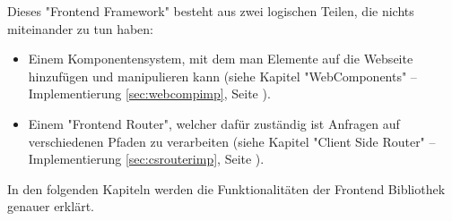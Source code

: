 Dieses "Frontend Framework" besteht aus zwei logischen Teilen, die nichts miteinander zu tun haben:
\begin{itemize}
    \item Einem Komponentensystem, mit dem man Elemente auf die Webseite hinzufügen und manipulieren kann (siehe Kapitel "WebComponents" -- Implementierung \ref{sec:webcompimp}, Seite \pageref{sec:webcompimp}).
    \item Einem "Frontend Router", welcher dafür zuständig ist Anfragen auf verschiedenen Pfaden zu verarbeiten (siehe Kapitel "Client Side Router" -- Implementierung \ref{sec:csrouterimp}, Seite \pageref{sec:csrouterimp}).
\end{itemize}

In den folgenden Kapiteln werden die Funktionalitäten der Frontend Bibliothek genauer erklärt.